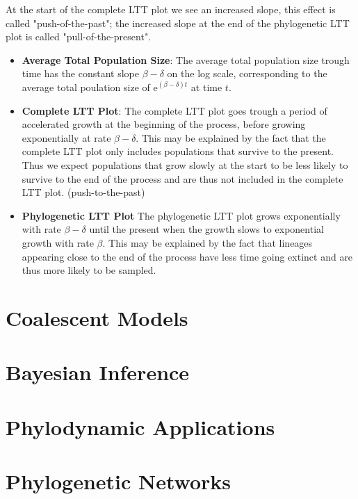 \documentclass{article}
\begin{document}
\begin{multicols*}{3}
At the start of the complete LTT plot we see an increased slope, this effect is called "push-of-the-past"; the increased slope at the end of the phylogenetic LTT plot is called "pull-of-the-present". 

\begin{itemize}
    \item \textbf{Average Total Population Size}: The average total population size trough time has the constant slope $\beta - \delta$ on the log scale, corresponding to the average total poulation size of $\text{e}^{(\beta - \delta)t}$ at time $t$.
    \item \textbf{Complete LTT Plot}: The complete LTT plot goes trough a period of accelerated growth at the beginning of the process, before growing exponentially at rate $\beta - \delta$. This may be explained by the fact that the complete LTT plot only includes populations that survive to the present. Thus we expect populations that grow slowly at the start to be less likely to survive to the end of the process and are thus not included in the complete LTT plot. (push-to-the-past)
    \item \textbf{Phylogenetic LTT Plot} The phylogenetic LTT plot grows exponentially with rate $\beta - \delta$ until the present when the growth slows to exponential growth with rate $\beta$. This may be explained by the fact that lineages appearing close to the end of the process have less time going extinct and are thus more likely to be sampled.
\end{itemize}

\section{Coalescent Models}
\section{Bayesian Inference}
\section{Phylodynamic Applications}
\section{Phylogenetic Networks}
\end{multicols*}
\end{document}
